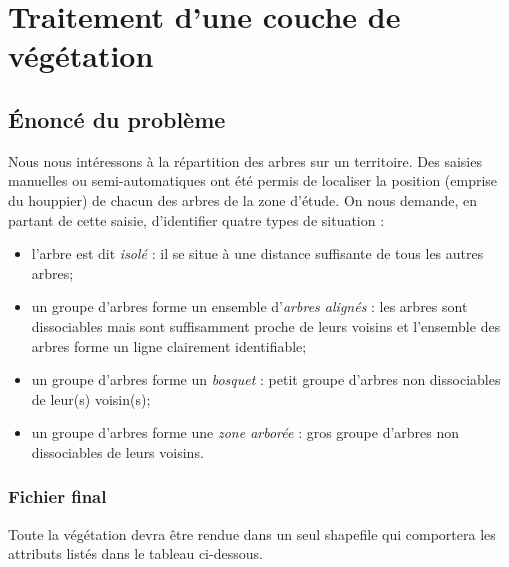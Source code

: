 \documentclass[11pt]{article}
\begin{document}
\section{Traitement d'une couche de végétation}

\subsection{Énoncé du problème}

Nous nous intéressons à la répartition des arbres sur un territoire. Des saisies manuelles ou semi-automatiques ont été permis de localiser la position (emprise du houppier) de chacun des arbres de la zone d'étude. On nous demande, en partant de cette saisie, d'identifier quatre types de situation :
\begin{itemize}
	\item l'arbre est dit \textit{isolé} : il se situe à une distance suffisante de tous les autres arbres;
	\item un groupe d'arbres forme un ensemble d'\textit{arbres alignés} : les arbres sont dissociables mais sont suffisamment proche de leurs voisins et l'ensemble des arbres forme un ligne clairement identifiable;
	\item un groupe d'arbres forme un \textit{bosquet} : petit groupe d'arbres non dissociables de leur(s) voisin(s);
	\item un groupe d'arbres forme une \textit{zone arborée} : gros groupe d'arbres non dissociables de leurs voisins.
\end{itemize}

\subsubsection{Fichier final}

Toute la végétation devra être rendue dans un seul shapefile qui comportera les attributs listés dans le tableau ci-dessous.
\end{document}
